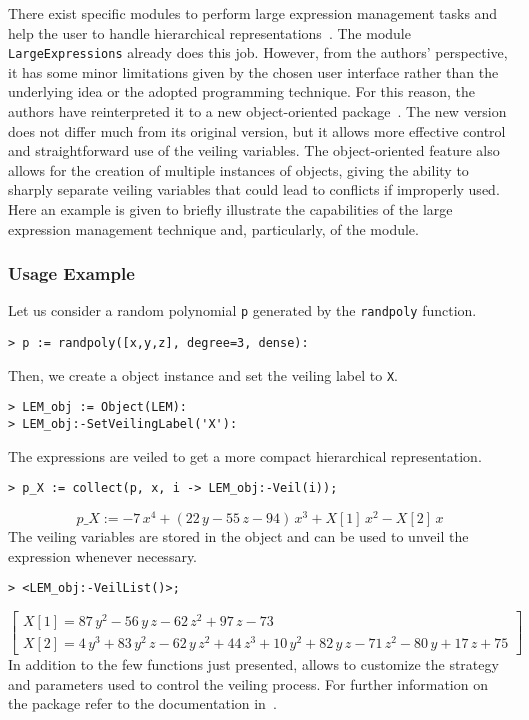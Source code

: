 There exist specific modules to perform large expression management tasks and help the user to handle hierarchical representations~\cite{carette2006linear,zhou2007symbolic}. The \Maple{} module \texttt{LargeExpressions} already does this job. However, from the authors' perspective, it has some minor limitations given by the chosen user interface rather than the underlying idea or the adopted programming technique. For this reason, the authors have reinterpreted it to a new object-oriented \LEM{} package~\cite{lem}. The new version does not differ much from its original version, but it allows more effective control and straightforward use of the veiling variables. The object-oriented feature also allows for the creation of multiple instances of \LEM{} objects, giving the ability to sharply separate veiling variables that could lead to conflicts if improperly used. Here an example is given to briefly illustrate the capabilities of the large expression management technique and, particularly, of the \LEM{} module.

\subsubsection{Usage Example}

Let us consider a random polynomial \texttt{p} generated by the \texttt{randpoly} function.
%
\begin{verbatim}
> p := randpoly([x,y,z], degree=3, dense):
\end{verbatim}
%
Then, we create a \LEM{} object instance and set the veiling label to \texttt{X}.
%
\begin{verbatim}
> LEM_obj := Object(LEM):
> LEM_obj:-SetVeilingLabel('X'):
\end{verbatim}
%
The expressions are veiled to get a more compact hierarchical representation.
%
\begin{verbatim}
> p_X := collect(p, x, i -> LEM_obj:-Veil(i));
\end{verbatim}
\begin{equation*}
    p\_X := -7\,x^4 + (22\,y - 55\,z - 94)\,x^3 + X[1]\,x^2 - X[2]\,x
\end{equation*}
%
The veiling variables are stored in the \LEM{} object and can be used to unveil the expression whenever necessary.
%
\begin{verbatim}
> <LEM_obj:-VeilList()>;
\end{verbatim}
\begin{equation*}
  \begin{bmatrix}
      X[1] = 87\,y^2 - 56\,y\,z - 62\,z^2 + 97\,z - 73 \\[1mm]
      X[2] = 4\,y^3 + 83\,y^2\,z - 62\,y\,z^2 + 44\,z^3 + 10\,y^2 + 82\,y\,z - 71\,z^2 - 80\,y + 17\,z + 75
    \end{bmatrix}
\end{equation*}
%
In addition to the few functions just presented, \LEM{} allows to customize the strategy and parameters used to control the veiling process. For further information on the \LEM{} package refer to the documentation in~\cite{lem}.


